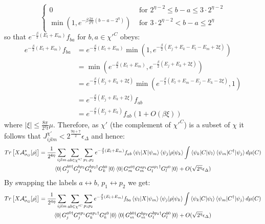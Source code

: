 \documentclass[aps,floatfix,10pt,amssymb,amsfont,amsmath,superscriptaddress,float,nofootinbib,longbibliography,nobalancelastpage,twocolumn]{revtex4-2}
\begin{document}
\begin{widetext}
\begin{equation}
\begin{cases}
    0&\text{ for }2^{\eta-2}\leq b-a \leq 3\cdot2^{\eta-2}\\
     \min(1,e^{-\beta\frac{2\pi}{2^{\eta}t}(b-a-2^{\eta})})&\text{ for }3\cdot 2^{\eta-2}< b-a \leq 2^{\eta}
    \end{cases}
\end{equation}
so that $e^{-\frac{\beta}{2}(E_l+E_m)}f_{ba}$ for $b,a \in \chi'^C$ obeys:
\begin{equation}
    \begin{aligned}
    e^{-\frac{\beta}{2}(E_l+E_m)}f_{ba} &= e^{-\frac{\beta}{2}(E_l+E_m)}\min(1,e^{-\frac{\beta}{2}(E_j+E_k-E_l-E_m + 2\xi)})\\
    &= \min(e^{-\frac{\beta}{2}(E_l+E_m)}, e^{-\frac{\beta}{2}(E_j+E_k + 2\xi)})\\
    &= e^{-\frac{\beta}{2}(E_j+E_k + 2\xi)} \min(e^{-\frac{\beta}{2}(E_l+E_m-E_j-E_k-2\xi)},1)\\
    &= e^{-\frac{\beta}{2}(E_j+E_k + 2\xi)}f_{ab}\\
    &= e^{-\frac{\beta}{2}(E_j+E_k)}f_{ab}(1+O(\beta\xi))
\end{aligned}
\label{eq:fabtofba}
\end{equation}
where $|\xi| \leq \frac{8\pi}{2^{\eta}t}\mu$. Therefore, as $\chi'$ (the complement of $\chi'^C$) is a subset of $\chi$ it follows that $J^{\chi'}_{ijlm} < 2^{\frac{9 \eta + 7}{2}}\epsilon_{\Delta}$ and hence:
\begin{multline}
    Tr\left[X\mathcal{A}^*_{\sigma_G}[\rho]\right] =\frac{1}{2^{4\eta}} \sum_{ijlm} \sum_{ab\in \chi'^C}\sum_{p_1,p_2}e^{-\frac{\beta}{2}(E_l+E_m)}f_{ab} \braket{\psi_l|X|\psi_m}\braket{\psi_j|\rho|\psi_k} \int \braket{\psi_k|C|\psi_l}\braket{\psi_m|C^{\dagger}|\psi_j} d\mu(C)\\ \bra{0} G^{b0\dagger}_jG^{bp_2}_jG^{bp_2\dagger}_kG^{b0}_k\ket{0}
    \bra{0}G_m^{a0\dagger}G_m^{ap_1}G_l^{ap_1\dagger}G_l^{a0}\ket{0} + O(\sqrt{2^{\eta}}\epsilon_{\Delta})
\end{multline}
By swapping the labels $a \leftrightarrow b$, $p_1 \leftrightarrow p_2$ we get:
\begin{multline}
    Tr\left[X\mathcal{A}^*_{\sigma_G}[\rho]\right] =\frac{1}{2^{4\eta}} \sum_{ijlm} \sum_{ab\in \chi'^C}\sum_{p_1p_2} e^{-\frac{\beta}{2}(E_l+E_m)}f_{ba} \braket{\psi_l|X|\psi_m}\braket{\psi_j|\rho|\psi_k} \int \braket{\psi_k|C|\psi_l}\braket{\psi_m|C^{\dagger}|\psi_j} d\mu(C)\\ \bra{0} G^{a0\dagger}_jG^{ap_1}_jG^{ap_1\dagger}_kG^{a0}_k\ket{0}
    \bra{0}G_m^{b0\dagger}G_m^{bp_2}G_l^{bp_2\dagger}G_l^{b0}\ket{0} + O(\sqrt{2^{\eta}}\epsilon_\Delta)

\end{multline}
\end{widetext}
\end{document}
